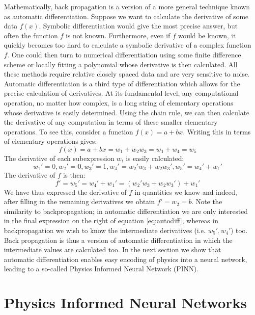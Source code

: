\documentclass{Dissertate}
\begin{document}
Mathematically, back propagation is a version of a more general
technique known as automatic differentiation. Suppose we want to
calculate the derivative of some data \(f(x)\). Symbolic differentiation
would give the most precise answer, but often the function \(f\) is not
known. Furthermore, even if \(f\) would be known, it quickly becomes too
hard to calculate a symbolic derivative of a complex function \(f\). One
could then turn to numerical differentiation using some finite
difference scheme or locally fitting a polynomial whose derivative is
then calculated. All these methods require relative closely spaced data
and are very sensitive to noise. Automatic differentiation is a third type of differentiation which allows for
the precise calculation of derivatives. At its
fundamental level, any computational operation, no matter how complex,
is a long string of elementary operations whose derivative is easily
determined. Using the chain rule, we can then calculate the derivative
of any computation in terms of these smaller elementary operations. To
see this, consider a function \(f(x) = a + bx\). Writing this in terms
of elementary operations gives: \[
f(x) = a+bx = w_1+ w_2w_3=w_1+w_4=w_5
\] The derivative of each subexpression \(w_i\) is easily calculated: \[
w_1' = 0, w_2'= 0, w_3'=1,w_4'=w_2'w_3+w_2w_3', w_5'=w_4'+w_1'
\] The derivative of \(f\) is then: \begin{equation}
f' = w_5' = w_4'+w_1' = (w_2'w_3+w_2w_3')+w_1'
\label{eq:autodiff}\end{equation} We have thus expressed the derivative
of \(f\) in quantities we know and indeed, after filling in the
remaining derivatives we obtain \(f' = w_2 =b\). Note the similarity to
backpropagation; in automatic differentiation we are only interested in
the final expression on the right of equation \ref{eq:autodiff},
whereas in backpropagation we wish to know the intermediate derivatives
(i.e. \(w_5', w_4'\)) too. Back propagation is thus a version of
automatic differentiation in which the intermediate values are
calculated too. In the next section we show that automatic
differentiation enables easy encoding of physics into a neural network,
leading to a so-called Physics Informed Neural Network (PINN).

\hypertarget{physics-informed-neural-networks-1}{%
\section{Physics Informed Neural
Networks}\label{physics-informed-neural-networks-1}}
\end{document}
